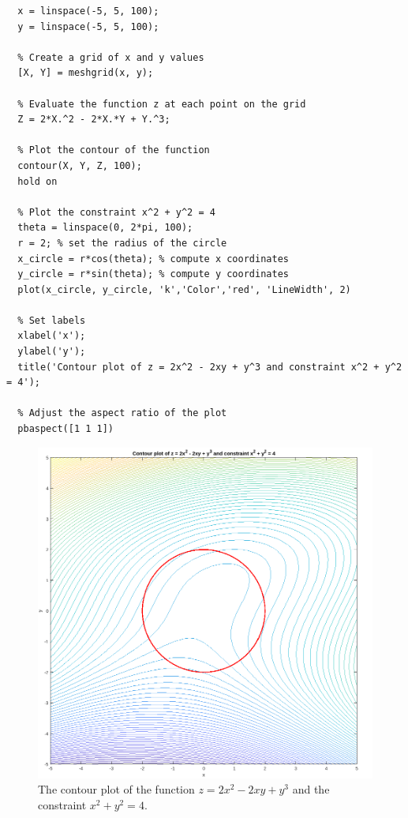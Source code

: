 \begin{lstlisting}[style=Matlab-editor]
  % Define the range of values for x and y
  x = linspace(-5, 5, 100);
  y = linspace(-5, 5, 100);
  
  % Create a grid of x and y values
  [X, Y] = meshgrid(x, y);
  
  % Evaluate the function z at each point on the grid
  Z = 2*X.^2 - 2*X.*Y + Y.^3;
  
  % Plot the contour of the function
  contour(X, Y, Z, 100);
  hold on
  
  % Plot the constraint x^2 + y^2 = 4
  theta = linspace(0, 2*pi, 100);
  r = 2; % set the radius of the circle
  x_circle = r*cos(theta); % compute x coordinates
  y_circle = r*sin(theta); % compute y coordinates
  plot(x_circle, y_circle, 'k','Color','red', 'LineWidth', 2)
  
  % Set labels
  xlabel('x');
  ylabel('y');
  title('Contour plot of z = 2x^2 - 2xy + y^3 and constraint x^2 + y^2 = 4');
  
  % Adjust the aspect ratio of the plot
  pbaspect([1 1 1])  
\end{lstlisting}

\begin{figure}[H]
  \centering
  \includegraphics[width=12cm]{graphics/2b.png}
  \caption{The contour plot of the function $z = 2x^2 - 2xy + y^3$ and the constraint $x^2 + y^2 = 4$.}
\end{figure}

